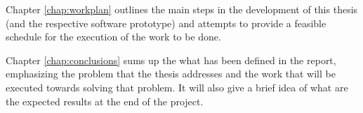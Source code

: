 Chapter \ref{chap:workplan} outlines the main steps in the development of this thesis (and the respective software prototype) and attempts to provide a feasible schedule for the execution of the work to be done.

Chapter \ref{chap:conclusions} sums up the what has been defined in the report, emphasizing the problem that the thesis addresses and the work that will be executed towards solving that problem. It will also give a brief idea of what are the expected results at the end of the project.